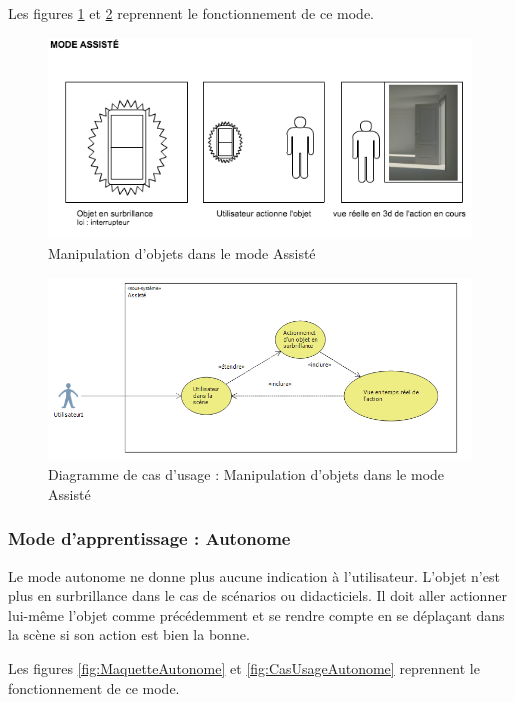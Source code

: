 Les figures \ref{fig:MaquetteAssiste} et \ref{fig:CasUsageAssiste} reprennent le fonctionnement de ce mode.

\begin{figure}[h]
\centering
\includegraphics[width=1\textwidth]{2-Specifications/img-utilisateur/assiste.png}
\caption{\label{fig:MaquetteAssiste} Manipulation d'objets dans le mode Assisté }
\end{figure}
\begin{figure}[h]
\centering
\includegraphics[width=1\textwidth]{2-Specifications/img-utilisateur/cas-usage-assiste.png}
\caption{\label{fig:CasUsageAssiste} Diagramme de cas d'usage : Manipulation d'objets dans le mode Assisté }
\end{figure}
\FloatBarrier


\subsubsection{Mode d'apprentissage : Autonome}

Le mode autonome ne donne plus aucune indication à l'utilisateur. L'objet n'est plus en surbrillance dans le cas de scénarios ou didacticiels. Il doit aller actionner lui-même l'objet comme précédemment et se rendre compte en se déplaçant dans la scène si son action est bien la bonne.

Les figures \ref{fig:MaquetteAutonome} et \ref{fig:CasUsageAutonome} reprennent le fonctionnement de ce mode.

